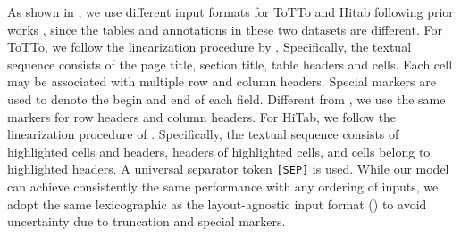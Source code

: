 \documentclass[11pt]{article}
\begin{document}
As shown in , we use different input formats for ToTTo and Hitab following prior works \citep{kale2020text,cheng2021hitab}, since the tables and annotations in these two datasets are different.
For ToTTo, we follow the linearization procedure by \citet{kale2020text}. 
Specifically, the textual sequence consists of the page title, section title, table headers and cells.
Each cell may be associated with multiple row and column headers. 
Special markers are used to denote the begin and end of each field. 
Different from \citet{kale2020text}, we use the same markers for row headers and column headers. 
For HiTab, we follow the linearization procedure of \citet{cheng2021hitab}. 
Specifically, the textual sequence consists of highlighted cells and headers, headers of highlighted cells, and cells belong to highlighted headers. 
A universal separator token \texttt{[SEP]} is used. 
While our model can achieve consistently the same performance with any ordering of inputs, we adopt the same lexicographic as the layout-agnostic input format () to avoid uncertainty due to truncation and special markers. 
\end{document}
